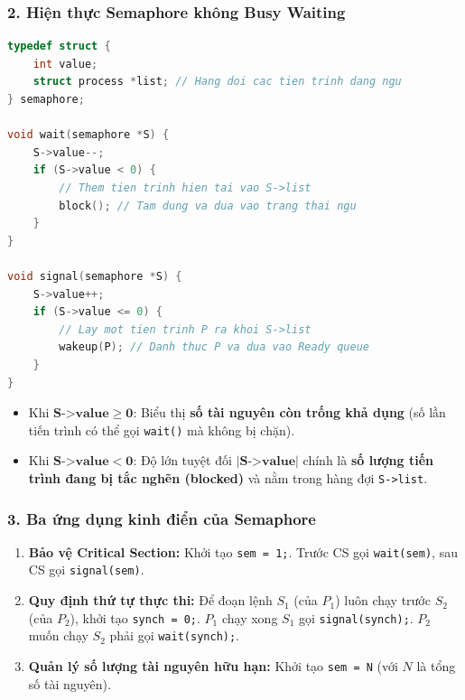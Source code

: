 \documentclass[11pt,a4paper]{article}
\begin{document}
\subsubsection{2. Hiện thực Semaphore không Busy Waiting}
\begin{lstlisting}[language=C]
typedef struct {
    int value;
    struct process *list; // Hang doi cac tien trinh dang ngu
} semaphore;

void wait(semaphore *S) {
    S->value--;
    if (S->value < 0) {
        // Them tien trinh hien tai vao S->list
        block(); // Tam dung va dua vao trang thai ngu
    }
}

void signal(semaphore *S) {
    S->value++;
    if (S->value <= 0) {
        // Lay mot tien trinh P ra khoi S->list
        wakeup(P); // Danh thuc P va dua vao Ready queue
    }
}
\end{lstlisting}

\begin{importantbox}
\begin{itemize}[noitemsep]
    \item Khi $\mathbf{S\text{->value} \ge 0}$: Biểu thị \textbf{số tài nguyên còn trống khả dụng} (số lần tiến trình có thể gọi \texttt{wait()} mà không bị chặn).
    \item Khi $\mathbf{S\text{->value} < 0}$: Độ lớn tuyệt đối $|\mathbf{S\text{->value}}|$ chính là \textbf{số lượng tiến trình đang bị tắc nghẽn (blocked)} và nằm trong hàng đợi \texttt{S->list}.
\end{itemize}
\end{importantbox}

\subsubsection{3. Ba ứng dụng kinh điển của Semaphore}
\begin{enumerate}[noitemsep]
    \item \textbf{Bảo vệ Critical Section:} Khởi tạo \texttt{sem = 1;}. Trước CS gọi \texttt{wait(sem)}, sau CS gọi \texttt{signal(sem)}.
    \item \textbf{Quy định thứ tự thực thi:} Để đoạn lệnh $S_1$ (của $P_1$) luôn chạy trước $S_2$ (của $P_2$), khởi tạo \texttt{synch = 0;}. $P_1$ chạy xong $S_1$ gọi \texttt{signal(synch);}. $P_2$ muốn chạy $S_2$ phải gọi \texttt{wait(synch);}.
    \item \textbf{Quản lý số lượng tài nguyên hữu hạn:} Khởi tạo \texttt{sem = N} (với $N$ là tổng số tài nguyên).
\end{enumerate}
\end{document}
